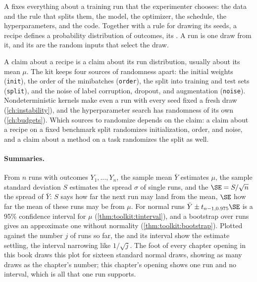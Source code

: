 \begin{refsection}
\begin{definition}\label{def:seeds:rundist}
A  fixes everything about a training run that the experimenter chooses: the data and the rule that splits them, the model, the optimizer, the schedule, the hyperparameters, and the code. Together with a rule for drawing its seeds, a recipe defines a probability distribution of outcomes, its . A run is one draw from it, and its  are the random inputs that select the draw.
\end{definition}

A claim about a recipe is a claim about its run distribution, usually about its mean $\mu$. The kit  keeps four sources of randomness apart: the initial weights (\texttt{init}), the order of the minibatches (\texttt{order}), the split into training and test sets (\texttt{split}), and the noise of label corruption, dropout, and augmentation (\texttt{noise}). Nondeterministic kernels make even a run with every seed fixed a fresh draw (\cref{ch:instability}), and the hyperparameter search has randomness of its own (\cref{ch:budgets}). Which sources to randomize depends on the claim: a claim about a recipe on a fixed benchmark split randomizes initialization, order, and noise, and a claim about a method on a task randomizes the split as well.

\paragraph{Summaries.} From $n$ runs with outcomes $Y_1,\dots,Y_n$, the sample mean $\bar Y$ estimates $\mu$, the sample standard deviation $S$ estimates the spread $\sigma$ of single runs, and the  $\SE=S/\sqrt n$ the spread of $\bar Y$: $S$ says how far the next run may land from the mean, $\SE$ how far the mean of these runs may be from $\mu$. For normal runs $\bar Y\pm t_{n-1,0.975}\SE$ is a 95\% confidence interval for $\mu$ (\cref{thm:toolkit:tinterval}), and a bootstrap over runs gives an approximate one without normality (\cref{thm:toolkit:bootstrap}). Plotted against the number $j$ of runs so far, the  and its interval show the estimate settling, the interval narrowing like $1/\sqrt j$. The foot of every chapter opening in this book draws this plot for sixteen standard normal draws, showing as many draws as the chapter's number; this chapter's opening shows one run and no interval, which is all that one run supports.


\end{refsection}
